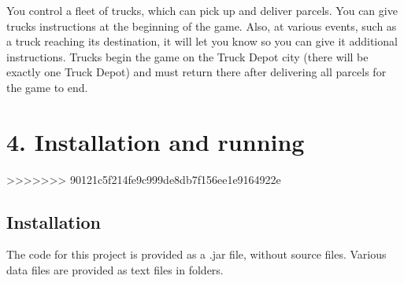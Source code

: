 \documentclass[11pt]{article}
\begin{document}
You control a fleet of trucks, which can pick up and deliver parcels. You can give trucks instructions at the beginning of the game.
Also, at various events, such as a truck reaching its destination, it will let you know so you can give it additional instructions.
Trucks begin the game on the Truck Depot city (there will be exactly one Truck Depot) and must return there after delivering all parcels for the game to end.

\section{4. Installation and running}
>>>>>>> 90121c5f214fe9c999de8db7f156ee1e9164922e
\subsection{Installation}
The code for this project is provided as a .jar file, without source files. Various data files are provided as text files in folders.
\end{document}
